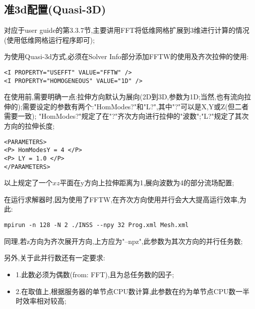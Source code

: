 \subsection{准3d配置(Quasi-3D)} \label{quasi3d}
对应于user guide的第3.3.7节,主要讲用FFT将低维网格扩展到3维进行计算的情况(使用低维网格运行程序即可);\par
为使用Quasi-3d方式,必须在Solver Info部分添加FFTW的使用及齐次拉伸的使用:
\begin{lstlisting}[frame=single]
<I PROPERTY="USEFFT" VALUE="FFTW" />
<I PROPERTY="HOMOGENEOUS" VALUE="1D" />
\end{lstlisting}
\par
在使用前,需要明确一点:拉伸方向默认为展向(2D到3D,参数为1D;当然,也有流向拉伸的);需要设定的参数有两个:"HomModes?"和"L?",其中"?"可以是X,Y或Z(但二者需要一致); "HomModes?"规定了在"?"齐次方向进行拉伸的"波数";"L?"规定了其次方向的拉伸长度;\par
\begin{lstlisting}[frame=single]
<PARAMETERS>
<P> HomModesY = 4 </P>
<P> LY = 1.0 </P>
</PARAMETERS>
\end{lstlisting}
\par
以上规定了一个$xz$平面在y方向上拉伸距离为1,展向波数为4的部分流场配置;\par
在运行求解器时,因为使用了FFTW,在齐次方向使用并行会大大提高运行效率,为此:
\begin{lstlisting}[frame=single]
mpirun -n 128 -N 2 ./INSS --npy 32 Prog.xml Mesh.xml
\end{lstlisting}
\par
同理,若z方向为齐次展开方向,上方应为"--npz",此参数为其次方向的并行任务数;\par
另外,关于此并行数还有一定要求:\par
\begin{itemize}
	\item{1.此数必须为偶数(from: FFT),且为总任务数的因子;}
	\item{2.在取值上,根据服务器的单节点CPU数计算,此参数在约为单节点CPU数一半时效率相对较高;}
\end{itemize}



